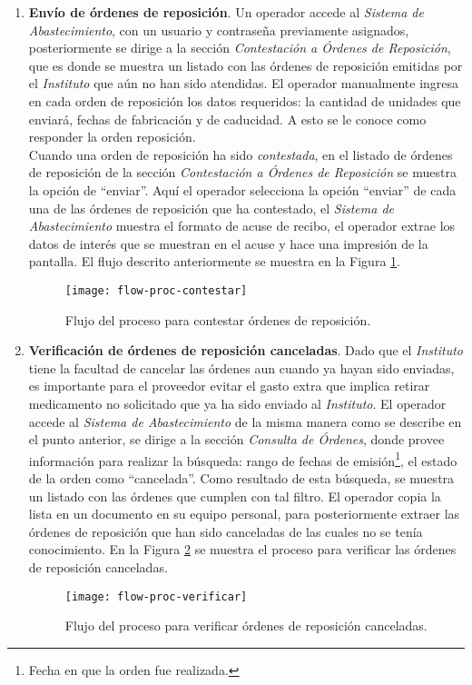 \begin{enumerate}
\item \textbf{Envío de órdenes de reposición}. Un operador accede al \textit{Sistema de Abastecimiento}, con un usuario y contraseña previamente asignados, posteriormente se dirige a la sección \textit{Contestación a Órdenes de Reposición}, que es donde se muestra un listado con las órdenes de reposición emitidas por el \textit{Instituto} que aún no han sido atendidas. El operador manualmente ingresa en cada orden de reposición los datos requeridos: la cantidad de unidades que enviará, fechas de fabricación y de caducidad. A esto se le conoce como responder la orden reposición.\\
Cuando una orden de reposición ha sido \textit{contestada}, en el listado de órdenes de reposición de la sección \textit{Contestación a Órdenes de Reposición} se muestra la opción de ``enviar''. Aquí el operador selecciona la opción ``enviar'' de cada una de las órdenes de reposición que ha contestado, el \textit{Sistema de Abastecimiento} muestra el formato de acuse de recibo, el operador extrae los datos de interés que se muestran en el acuse y hace una impresión de la pantalla. El flujo descrito anteriormente se muestra en la Figura \ref{fig:flow-proc-contestar}.
\begin{figure}[H]
\centering
\texttt{[image: flow-proc-contestar]} 
\caption{Flujo del proceso para contestar órdenes de reposición.}
\label{fig:flow-proc-contestar}
\end{figure}
\item \textbf{Verificación de órdenes de reposición canceladas}. Dado que el \textit{Instituto} tiene la facultad de cancelar las órdenes aun cuando ya hayan sido enviadas, es importante para el proveedor evitar el gasto extra que implica retirar medicamento no solicitado que ya ha sido enviado al \textit{Instituto}. El operador accede al \textit{Sistema de Abastecimiento} de la misma manera como se describe en el punto anterior, se dirige a la sección \textit{Consulta de Órdenes}, donde provee información para realizar la búsqueda: rango de fechas de emisión\footnote{Fecha en que la orden fue realizada.}, el estado de la orden como ``cancelada''. Como resultado de esta búsqueda, se muestra un listado con las órdenes que cumplen con tal filtro. El operador copia la lista en un documento en su equipo personal, para posteriormente extraer las órdenes de reposición que han sido canceladas de las cuales no se tenía conocimiento. En la Figura \ref{fig:flow-proc-verificar} se muestra el proceso para verificar las órdenes de reposición canceladas.
\begin{figure}[H]
\centering
\texttt{[image: flow-proc-verificar]} 
\caption{Flujo del proceso para verificar órdenes de reposición canceladas.}
\label{fig:flow-proc-verificar}
\end{figure}
\end{enumerate}

